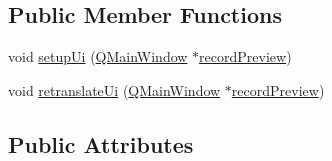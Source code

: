 \subsection*{Public Member Functions}
\begin{DoxyCompactItemize}
\item 
void \hyperlink{a00028_afa41dc070a896a5eae476f3c0206825c}{setup\+Ui} (\hyperlink{a00010}{Q\+Main\+Window} $\ast$\hyperlink{a00020}{record\+Preview})
\item 
void \hyperlink{a00028_ad30b831cfb4b32956fe67a79748ba194}{retranslate\+Ui} (\hyperlink{a00010}{Q\+Main\+Window} $\ast$\hyperlink{a00020}{record\+Preview})
\end{DoxyCompactItemize}
\subsection*{Public Attributes}
